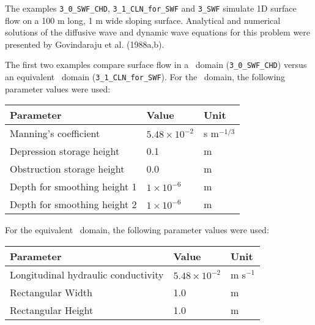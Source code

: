 \label{section:1d_hillslope_example}
The examples \texttt{3\_0\_SWF\_CHD}, \texttt{3\_1\_CLN\_for\_SWF} and \texttt{3\_SWF} simulate 1D surface flow on a 100 m long, 1 m wide sloping surface.  Analytical and
numerical solutions of the diffusive wave and dynamic wave equations for this problem were presented by Govindaraju
et al. (1988a,b).

The first two examples compare surface flow in a \swf\ domain (\texttt{3\_0\_SWF\_CHD}) versus an equivalent \cln\ domain (\texttt{3\_1\_CLN\_for\_SWF}). For the \swf\ domain, the following parameter values were used:

\begin{center}
    \begin{tabular}{lll}  \hline
        Parameter                           & Value                     &   Unit            \\ \hline
        Manning's coefficient               &  $5.48 \times 10^{-2}$    &   s m$^{-1/3}$   \\
        Depression storage height           &  0.1                      &   m               \\
        Obstruction storage height          &  0.0                      &   m               \\
        Depth for smoothing height 1        &  $1 \times 10^{-6}$       &   m               \\
        Depth for smoothing height 2        &  $1 \times 10^{-6}$       &   m               \\
    \hline
    \end{tabular}
\end{center}


For the equivalent \cln\ domain, the following parameter values were used:

\begin{center}
    \begin{tabular}{lll}  \hline
        Parameter                               & Value                     &   Unit            \\ \hline
        Longitudinal hydraulic conductivity     &  $5.48 \times 10^{-2}$    &   m s$^{-1}$      \\
        Rectangular Width                       &  1.0                      &   m               \\
        Rectangular Height                      &  1.0                      &   m               \\
    \hline
    \end{tabular}
\end{center}

